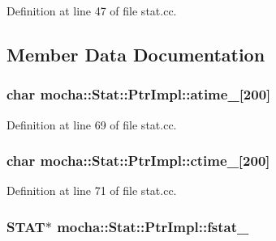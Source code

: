 Definition at line 47 of file stat.cc.



\subsection{Member Data Documentation}
\hypertarget{classmocha_1_1_stat_1_1_ptr_impl_a3e407e516089e4e28eacfa350abecd75}{
\subsubsection[{atime\_\-}]{\setlength{\rightskip}{0pt plus 5cm}char {\bf mocha::Stat::PtrImpl::atime\_\-}\mbox{[}200\mbox{]}}}
\label{classmocha_1_1_stat_1_1_ptr_impl_a3e407e516089e4e28eacfa350abecd75}


Definition at line 69 of file stat.cc.

\hypertarget{classmocha_1_1_stat_1_1_ptr_impl_af5fca59f95789c29e724e5ab35d5919a}{
\subsubsection[{ctime\_\-}]{\setlength{\rightskip}{0pt plus 5cm}char {\bf mocha::Stat::PtrImpl::ctime\_\-}\mbox{[}200\mbox{]}}}
\label{classmocha_1_1_stat_1_1_ptr_impl_af5fca59f95789c29e724e5ab35d5919a}


Definition at line 71 of file stat.cc.

\hypertarget{classmocha_1_1_stat_1_1_ptr_impl_a9093545fe03a8acad05f4ae2bb77f8d4}{
\subsubsection[{fstat\_\-}]{\setlength{\rightskip}{0pt plus 5cm}STAT$\ast$ {\bf mocha::Stat::PtrImpl::fstat\_\-}}}
\label{classmocha_1_1_stat_1_1_ptr_impl_a9093545fe03a8acad05f4ae2bb77f8d4}


